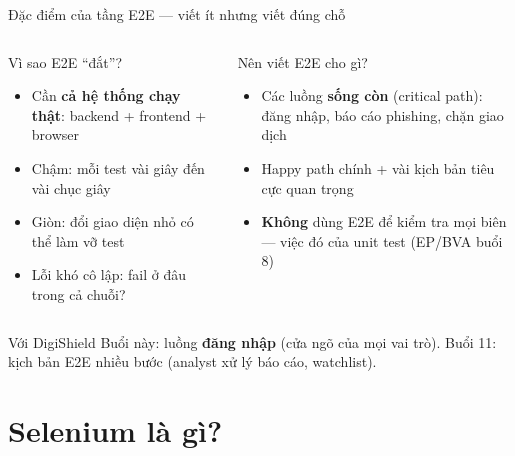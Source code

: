\documentclass[aspectratio=169,12pt]{beamer}
\begin{document}
\begin{frame}{Đặc điểm của tầng E2E --- viết ít nhưng viết đúng chỗ}
  \begin{columns}[T]
    \begin{block}{Vì sao E2E ``đắt''?}
      \begin{itemize}
        \item Cần \textbf{cả hệ thống chạy thật}: backend + frontend + browser
        \item Chậm: mỗi test vài giây đến vài chục giây
        \item Giòn: đổi giao diện nhỏ có thể làm vỡ test
        \item Lỗi khó cô lập: fail ở đâu trong cả chuỗi?
      \end{itemize}
    \end{block}

    \begin{block}{Nên viết E2E cho gì?}
      \begin{itemize}
        \item Các luồng \textbf{sống còn} (critical path):
              đăng nhập, báo cáo phishing, chặn giao dịch
        \item Happy path chính + vài kịch bản tiêu cực quan trọng
        \item \textbf{Không} dùng E2E để kiểm tra mọi biên
              --- việc đó của unit test (EP/BVA buổi 8)
      \end{itemize}
    \end{block}
  \end{columns}

  \vspace{0.3em}
  \begin{exampleblock}{Với DigiShield}
    Buổi này: luồng \textbf{đăng nhập} (cửa ngõ của mọi vai trò).
    Buổi 11: kịch bản E2E nhiều bước (analyst xử lý báo cáo, watchlist).
  \end{exampleblock}
\end{frame}

\section{Selenium là gì?}
\end{document}
